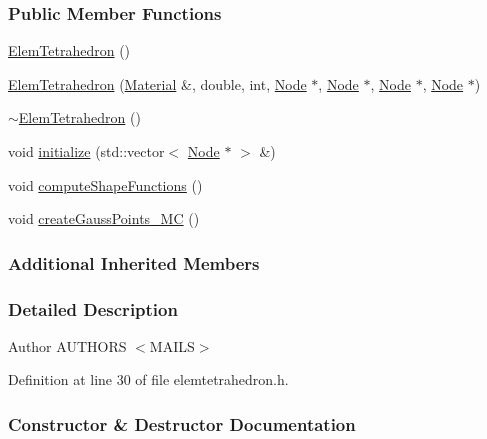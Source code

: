 \subsubsection*{Public Member Functions}
\begin{DoxyCompactItemize}
\item 
\hyperlink{classmknix_1_1_elem_tetrahedron_aa3141ce1b742562eb40bfe0c7e376956}{Elem\+Tetrahedron} ()
\item 
\hyperlink{classmknix_1_1_elem_tetrahedron_acc770204f5dd41e0cf453c6235535115}{Elem\+Tetrahedron} (\hyperlink{classmknix_1_1_material}{Material} \&, double, int, \hyperlink{classmknix_1_1_node}{Node} $\ast$, \hyperlink{classmknix_1_1_node}{Node} $\ast$, \hyperlink{classmknix_1_1_node}{Node} $\ast$, \hyperlink{classmknix_1_1_node}{Node} $\ast$)
\item 
\hyperlink{classmknix_1_1_elem_tetrahedron_a2f836d024ff3adf00b94a3371505cff4}{$\sim$\+Elem\+Tetrahedron} ()
\item 
void \hyperlink{classmknix_1_1_elem_tetrahedron_a1f42683d35b87bfd4ddd4e83824d040d}{initialize} (std\+::vector$<$ \hyperlink{classmknix_1_1_node}{Node} $\ast$ $>$ \&)
\item 
void \hyperlink{classmknix_1_1_elem_tetrahedron_a09d199d493dd9642da2ccb7190306b18}{compute\+Shape\+Functions} ()
\item 
void \hyperlink{classmknix_1_1_elem_tetrahedron_ac2c5c2984da8dca498cbf16153130595}{create\+Gauss\+Points\+\_\+\+M\+C} ()
\end{DoxyCompactItemize}
\subsubsection*{Additional Inherited Members}


\subsubsection{Detailed Description}
\begin{DoxyAuthor}{Author}
A\+U\+T\+H\+O\+R\+S $<$\+M\+A\+I\+L\+S$>$ 
\end{DoxyAuthor}


Definition at line 30 of file elemtetrahedron.\+h.



\subsubsection{Constructor \& Destructor Documentation}
\hypertarget{classmknix_1_1_elem_tetrahedron_aa3141ce1b742562eb40bfe0c7e376956}{}
